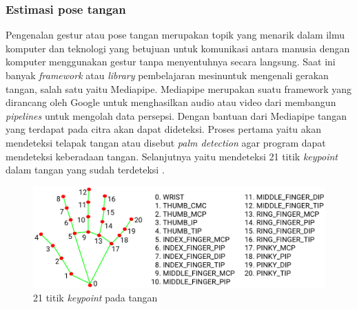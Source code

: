 \subsubsection{Estimasi pose tangan}
Pengenalan gestur atau pose tangan merupakan topik yang menarik dalam ilmu komputer dan teknologi yang betujuan untuk komunikasi antara manusia dengan komputer menggunakan gestur tanpa menyentuhnya secara langsung. Saat ini banyak \textit{framework} atau \textit{library} pembelajaran mesinuntuk mengenali gerakan tangan, salah satu yaitu Mediapipe. Mediapipe merupakan suatu framework yang dirancang oleh Google untuk menghasilkan audio atau video dari membangun \textit{pipelines} untuk mengolah data persepsi. Dengan bantuan dari Mediapipe tangan yang terdapat pada citra akan dapat dideteksi. Proses pertama yaitu akan mendeteksi telapak tangan atau disebut \textit{palm detection} agar program dapat mendeteksi keberadaan tangan. Selanjutnya yaitu mendeteksi 21 titik \textit{keypoint} dalam tangan yang sudah terdeteksi \parencite{UniversitasDinamika}. 

\begin{figure}[!h]
  \centering
	\includegraphics[width=1\linewidth]{gambar/hand_landmarks.png}
	\caption{21 titik \textit{keypoint} pada tangan \parencite{mediapipe}}
	\label{fig:tangan}
\end{figure}

